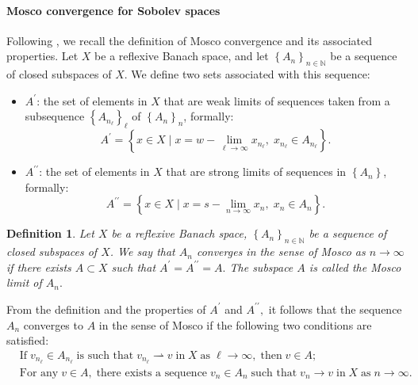 \documentclass[a4paper,12pt,reqno,natbib]{amsart}
\newtheorem{definition}[theorem]{Definition}
\begin{document}
\paragraph{\bf Mosco convergence for Sobolev spaces} Following \cite{BucurBook2005,bucur2001continuity,giacomini2002stability}, we recall the definition of Mosco convergence and its associated properties. Let $X$ be a reflexive Banach space, and let 
$\left\{A_n\right\}_{n \in \mathbb{N}}$ be a sequence of closed subspaces of $X.$ We define two sets associated with this sequence:
\begin{itemize}
    \item $A^{\prime}$: the set of elements in $X$ that are weak limits of sequences taken from a subsequence $\left\{A_{n_\ell}\right\}_\ell$ of $\left\{A_n\right\}_n$, formally:
    $$A^{\prime}=\left\{x \in X \mid x=w-\lim _{\ell \rightarrow \infty} x_{n_\ell},\; x_{n_\ell} \in A_{n_\ell}\right\}.$$
    \item  $A^{\prime \prime}$: the set of elements in $X$ that are strong limits of sequences in $\left\{A_n\right\}$, formally:
    $$
    A^{\prime \prime}=\left\{x \in X \mid x=s-\lim _{n \rightarrow \infty} x_n,\; x_n \in A_n\right\}.
    $$
\end{itemize}

\begin{definition}
 Let $X$ be a reflexive Banach space, $\left\{A_n\right\}_{n \in \mathbb{N}}$ be a sequence of closed subspaces of $X$. We say that $A_n$ converges in the sense of Mosco as $n \rightarrow \infty$ if there exists $A\subset X$ such that  $A^\prime=A^{\prime \prime}=A.$ The subspace $A$ is called the Mosco limit of $A_n.$
\end{definition}

From the definition and the properties of $A^{\prime}$ and $A^{\prime \prime},$ it follows that the sequence $A_n$ converges to $A$ in the sense of Mosco if the following two conditions are satisfied:
\begin{align}
    \label{condition1}&\text{If}\; v_{n_\ell}\in A_{n_\ell}\;\text{is such that}\; v_{n_\ell}\rightharpoonup v\;\text{in}\; X\; \text{as}\; \ell \rightarrow \infty,\; \text{then}\; v\in A;\\
    \label{condition2}&\text{For any}\; v\in A,\;\text{there exists a sequence}\; v_{n}\in A_n\;\text{such that}\; v_n\rightarrow v\; \text{in}\; X\; \text{as}\; n \rightarrow \infty.
\end{align}
\end{document}

